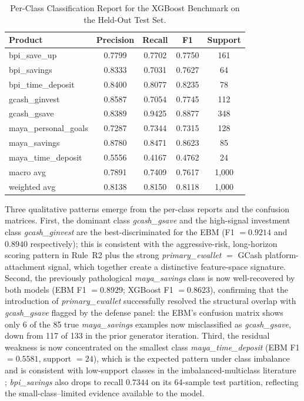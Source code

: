 \documentclass{icsthesis}
\begin{document}
\begin{mainmatter}
					\begin{table}[h]
					\vspace{4ex}
					\centering
					\caption{Per-Class Classification Report for the XGBoost Benchmark on the Held-Out Test Set.}
					\label{tab:xgb-per-class}
					\footnotesize
					\begin{tabular}{|l|c|c|c|c|}
						\hline
						\textbf{Product} & \textbf{Precision} & \textbf{Recall} & \textbf{F1} & \textbf{Support} \\
						\hline
						bpi\_save\_up & 0.7799 & 0.7702 & 0.7750 & 161 \\
						bpi\_savings & 0.8333 & 0.7031 & 0.7627 & 64 \\
						bpi\_time\_deposit & 0.8400 & 0.8077 & 0.8235 & 78 \\
						gcash\_ginvest & 0.8587 & 0.7054 & 0.7745 & 112 \\
						gcash\_gsave & 0.8389 & 0.9425 & 0.8877 & 348 \\
						maya\_personal\_goals & 0.7287 & 0.7344 & 0.7315 & 128 \\
						maya\_savings & 0.8780 & 0.8471 & 0.8623 & 85 \\
						maya\_time\_deposit & 0.5556 & 0.4167 & 0.4762 & 24 \\
						\hline
						macro avg & 0.7891 & 0.7409 & 0.7617 & 1{,}000 \\
						weighted avg & 0.8138 & 0.8150 & 0.8118 & 1{,}000 \\
						\hline
					\end{tabular}
					\vspace{4ex}
					\end{table}

					Three qualitative patterns emerge from the per-class reports and the confusion matrices. First, the dominant class \emph{gcash\_gsave} and the high-signal investment class \emph{gcash\_ginvest} are the best-discriminated for the EBM (F1 $=0.9214$ and $0.8940$ respectively); this is consistent with the aggressive-risk, long-horizon scoring pattern in Rule~R2 plus the strong \emph{primary\_ewallet} $=$ GCash platform-attachment signal, which together create a distinctive feature-space signature. Second, the previously pathological \emph{maya\_savings} class is now well-recovered by both models (EBM F1 $=0.8929$; XGBoost F1 $=0.8623$), confirming that the introduction of \emph{primary\_ewallet} successfully resolved the structural overlap with \emph{gcash\_gsave} flagged by the defense panel: the EBM's confusion matrix shows only 6 of the 85 true \emph{maya\_savings} examples now misclassified as \emph{gcash\_gsave}, down from 117 of 133 in the prior generator iteration. Third, the residual weakness is now concentrated on the smallest class \emph{maya\_time\_deposit} (EBM F1 $=0.5581$, support $=24$), which is the expected pattern under class imbalance and is consistent with low-support classes in the imbalanced-multiclass literature \cite{ref58}; \emph{bpi\_savings} also drops to recall $0.7344$ on its 64-sample test partition, reflecting the small-class--limited evidence available to the model.


\end{mainmatter}
\end{document}
